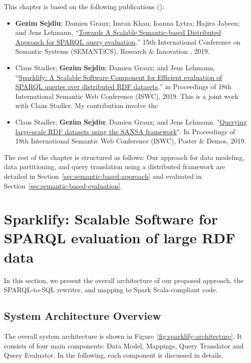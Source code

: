 This chapter is based on the following publications (\cite{sejdiu-2019-sansa-semantic-based-semantics,2019-sansa-sparklify-iswc, sansa-sparklify-ISWC-demo}):
\begin{itemize}
     \item \textbf{Gezim Sejdiu}; Damien Graux; Imran Khan; Ioanna Lytra; Hajira Jabeen; and Jens Lehmann, “\href{https://gezimsejdiu.github.io/publications/semantic_based_query_paper_SEMANTICS2019.pdf}{Towards A Scalable Semantic-based Distributed Approach for SPARQL query evaluation},” 15th International Conference on Semantic Systems (SEMANTiCS), Research \& Innovation , 2019.
     
    \item Claus Stadler; \textbf{Gezim Sejdiu}; Damien Graux; and Jens Lehmann, “\href{http://jens-lehmann.org/files/2019/iswc_sparklify.pdf}{Sparklify: A Scalable Software Component for Efficient evaluation of SPARQL queries over distributed RDF datasets},” in Proceedings of 18th International Semantic Web Conference (ISWC), 2019. 
    This is a joint work with Claus Stadler.
    My contribution involve the 
    
    \item Claus Stadler; \textbf{Gezim Sejdiu}; Damien Graux; and Jens Lehmann. "\href{https://gezimsejdiu.github.io/publications/sansa-sparklify-ISWC-demo.pdf}{Querying large-scale RDF datasets using the SANSA framework}".  In Proceedings of 18th International Semantic Web Conference (ISWC), Poster \& Demos, 2019.
\end{itemize}

The rest of the chapter is structured as follows:
Our approach for data modeling, data partitioning, and query translation using a distributed framework are detailed in Section~\ref{sec:semantic-based-approach} and evaluated in Section~\ref{sec:semantic-based-evaluation}.

\section{Sparklify: Scalable Software for SPARQL evaluation of large RDF data}
\label{sec:sparklify-approach}
In this section, we present the overall architecture of our proposed approach, the SPARQL-to-SQL rewriter, and mapping to Spark Scala-compliant code.

\subsection{System Architecture Overview}
The overall system architecture is shown in Figure~\ref{fig:sparklify-architecture}.
It consists of four main components: Data Model, Mappings, Query Translator and Query Evaluator.
In the following, each component is discussed in details.

